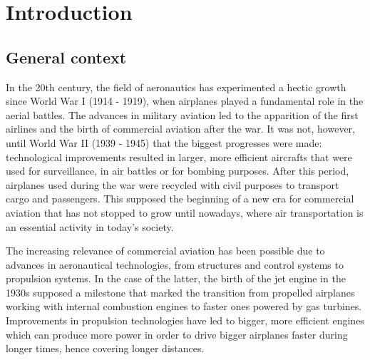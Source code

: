 \chapter{Introduction}
    

\section{General context}





In the 20th century, the field of aeronautics has experimented a hectic growth since World War I (1914 - 1919), when airplanes played a fundamental role in the aerial battles. The advances in military aviation led to the apparition of the first airlines and the birth of commercial aviation after the war. It was not, however, until World War II (1939 - 1945) that the biggest progresses were made: technological improvements resulted in larger, more efficient aircrafts that were used for surveillance, in air battles or for bombing purposes. After this period, airplanes used during the war were recycled with civil purposes to transport cargo and passengers. This supposed the beginning of a new era for commercial aviation that has not stopped to grow until nowadays, where air transportation is an essential activity in today's society.

The increasing relevance of commercial aviation has been possible due to advances in aeronautical technologies, from structures and control systems to propulsion systems. In the case of the latter, the birth of the jet engine in the 1930s supposed a milestone that marked the transition from propelled airplanes working with internal combustion engines to faster ones powered by gas turbines. Improvements in propulsion technologies have led to bigger, more efficient engines which can produce more power in order to drive bigger airplanes faster during longer times, hence covering longer distances. 


